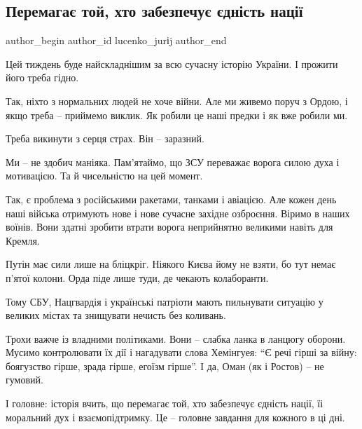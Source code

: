  
 
 
 
 
 
\subsection{Перемагає той, хто забезпечує єдність нації}
\label{sec:14_02_2022.stz.news.ua.pravda.1.peremoga_jednist_nacii}
 
\ifcmt
 author_begin
   author_id lucenko_jurіj
 author_end
\fi

Цей тиждень буде найскладнішим за всю сучасну історію України. І прожити його
треба гідно.

Так, ніхто з нормальних людей не хоче війни. Але ми живемо поруч з Ордою, і
якщо треба – приймемо виклик. Як робили це наші предки і як вже робили ми.

Треба викинути з серця страх. Він – заразний.

Ми – не здобич маніяка. Пам'ятаймо, що ЗСУ переважає ворога силою духа і
мотивацією. Та й чисельністю на цей момент.

Так, є проблема з російськими ракетами, танками і авіацією. Але кожен день наші
війська отримують нове і нове сучасне західне озброєння. Віримо в наших воїнів.
Вони здатні зробити втрати ворога неприйнятно великими навіть для Кремля.

Путін має сили лише на бліцкріг. Ніякого Києва йому не взяти, бо тут немає
п'ятої колони. Орда піде лише туди, де чекають колаборанти.

Тому СБУ, Нацгвардія і українські патріоти мають пильнувати ситуацію у великих
містах та знищувати нечисть без коливань.

Трохи важче із владними політиками. Вони – слабка ланка в ланцюгу оборони.
Мусимо контролювати їх дії і нагадувати слова Хемінгуея: \enquote{Є речі гірші за
війну: боягузство гірше, зрада гірше, егоїзм гірше}. І да, Оман (як і Ростов) –
не гумовий.

І головне: історія вчить, що перемагає той, хто забезпечує єдність нації, їі
моральний дух і взаємопідтримку. Це – головне завдання для кожного в ці дні.

